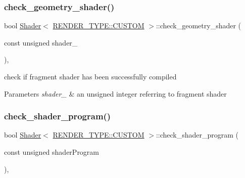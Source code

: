 \subsubsection{\texorpdfstring{check\+\_\+geometry\+\_\+shader()}{check\_geometry\_shader()}\hspace{0.1cm}{\footnotesize\ttfamily [2/2]}}
{\footnotesize\ttfamily bool \mbox{\hyperlink{classShader}{Shader}}$<$ \mbox{\hyperlink{shader__class_8hpp_a24e288e18eb7b6e01de7565001fedb60a72baef04098f035e8a320b03ad197818}{R\+E\+N\+D\+E\+R\+\_\+\+T\+Y\+P\+E\+::\+C\+U\+S\+T\+OM}} $>$\+::check\+\_\+geometry\+\_\+shader (\begin{DoxyParamCaption}\item[{const unsigned}]{shader\+\_\+ }\end{DoxyParamCaption})\hspace{0.3cm}{\ttfamily [inline]}, {\ttfamily [protected]}}



check if fragment shader has been successfully compiled 


\begin{DoxyParams}{Parameters}
{\em shader\+\_\+} & an unsigned integer referring to fragment shader \\
\hline
\end{DoxyParams}
\mbox{\label{classShader_3_01RENDER__TYPE_1_1CUSTOM_01_4_af59ced307a40764c2fa1acef66e074b3}} 
\subsubsection{\texorpdfstring{check\+\_\+shader\+\_\+program()}{check\_shader\_program()}\hspace{0.1cm}{\footnotesize\ttfamily [1/2]}}
{\footnotesize\ttfamily bool \mbox{\hyperlink{classShader}{Shader}}$<$ \mbox{\hyperlink{shader__class_8hpp_a24e288e18eb7b6e01de7565001fedb60a72baef04098f035e8a320b03ad197818}{R\+E\+N\+D\+E\+R\+\_\+\+T\+Y\+P\+E\+::\+C\+U\+S\+T\+OM}} $>$\+::check\+\_\+shader\+\_\+program (\begin{DoxyParamCaption}\item[{const unsigned}]{shader\+Program }\end{DoxyParamCaption})\hspace{0.3cm}{\ttfamily [inline]}, {\ttfamily [protected]}}



